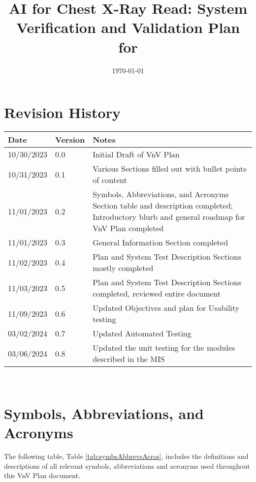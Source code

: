\documentclass[12pt, titlepage]{article}
\begin{document}
\title{AI for Chest X-Ray Read: System Verification and Validation Plan for \progname{}} 
\author{\authname}
\date{\today}
	
\maketitle


\section*{Revision History}

\begin{tabularx}{\textwidth}{p{3cm}p{2cm}X}
    \toprule {\bf Date} & {\bf Version} & {\bf Notes}\\
    \midrule
    10/30/2023 & 0.0 & Initial Draft of VnV Plan\\
    10/31/2023 & 0.1 & Various Sections filled out with bullet points of content\\
    11/01/2023 & 0.2 & Symbols, Abbreviations, and Acronyms Section table and description completed; Introductory blurb and general roadmap for VnV Plan completed\\
    11/01/2023 & 0.3 & General Information Section completed\\
    11/02/2023 & 0.4 & Plan and System Test Description Sections mostly completed\\
    11/03/2023 & 0.5 & Plan and System Test Description Sections completed, reviewed entire document\\
    11/09/2023 & 0.6 & Updated Objectives and plan for Usability testing\\
    03/02/2024 & 0.7 & Updated Automated Testing \\
    03/06/2024 & 0.8 & Updated the unit testing for the modules described in the MIS \\
    \bottomrule
\end{tabularx}

~\\

\newpage

\tableofcontents

\listoftables

\listoffigures

\newpage

\section{Symbols, Abbreviations, and Acronyms}
The following table, Table \ref{tab:symbsAbbrevsAcros}, includes the definitions and descriptions of all relevant symbols, abbreviations and acronyms used throughout this VnV Plan document.
\end{document}

